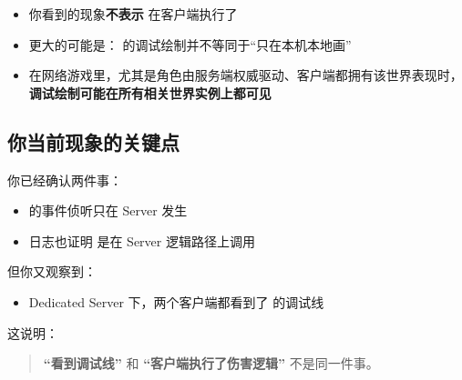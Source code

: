 \begin{itemize}
	\item 你看到的现象\textbf{不表示}  在客户端执行了
	\item 更大的可能是： 的调试绘制并不等同于“只在本机本地画”
	\item 在网络游戏里，尤其是角色由服务端权威驱动、客户端都拥有该世界表现时，\textbf{调试绘制可能在所有相关世界实例上都可见}
\end{itemize}

\subsection{你当前现象的关键点}

你已经确认两件事：

\begin{itemize}
	\item {} 的事件侦听只在 Server 发生
	\item 日志也证明  是在 Server 逻辑路径上调用
\end{itemize}

但你又观察到：

\begin{itemize}
	\item Dedicated Server 下，两个客户端都看到了  的调试线
\end{itemize}

这说明：

\begin{quote}
	\textbf{“看到调试线”} 和 \textbf{“客户端执行了伤害逻辑”} 不是同一件事。
\end{quote}

